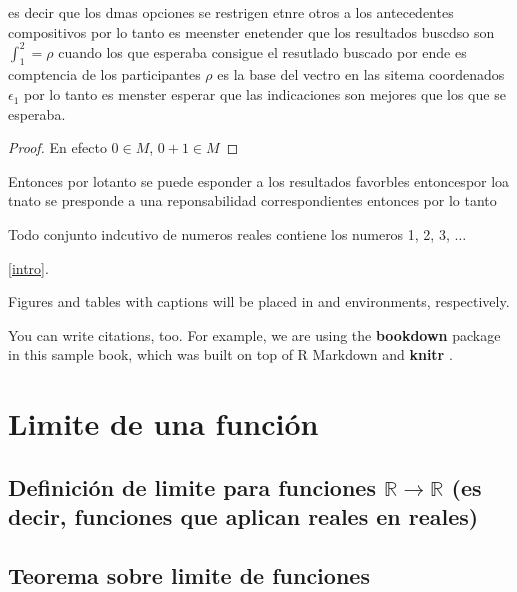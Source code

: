 \documentclass[12pt,]{report}
\theoremstyle{slplain}
\let\BeginKnitrBlock\begin \let\EndKnitrBlock\end
\begin{document}
es decir que los dmas opciones se restrigen etnre otros a los antecedentes compositivos por lo tanto es meenster enetender que los resultados buscdso son \(\int_1^2=\rho\) cuando los que esperaba consigue el resutlado buscado por ende es comptencia de los participantes \(\rho\) es la base del vectro en las sitema coordenados \(\epsilon_1\) por lo tanto es menster esperar que las indicaciones son mejores que los que se esperaba.
\BeginKnitrBlock{proof}
{}En efecto \(0\in M\), \(0+1\in M\)
\EndKnitrBlock{proof}

Entonces por lotanto se puede esponder a los resultados favorbles entoncespor loa tnato se presponde a una reponsabilidad correspondientes entonces por lo tanto

\BeginKnitrBlock{theorem}[Principio de inducción matemática]
\protect\hypertarget{thm:w1}{}{\label{thm:w1} {} }Todo conjunto indcutivo de numeros reales contiene los numeros 1, 2, 3, \(\ldots\)
\EndKnitrBlock{theorem}

\ref{intro}.

Figures and tables with captions will be placed in and environments, respectively.

You can write citations, too. For example, we are using the \textbf{bookdown} package \citep{R-bookdown} in this sample book, which was built on top of R Markdown and \textbf{knitr} \citep{xie2015}.

\hypertarget{limite-de-una-funciuxf3n}{%
\chapter{Limite de una función}\label{limite-de-una-funciuxf3n}}

\hypertarget{definiciuxf3n-de-limite-para-funciones-mathbbrto-mathbbr-es-decir-funciones-que-aplican-reales-en-reales}{%
\section{\texorpdfstring{Definición de limite para funciones \(\mathbb{R}\to \mathbb{R}\) (es decir, funciones que aplican reales en reales)}{Definición de limite para funciones \textbackslash{}mathbb\{R\}\textbackslash{}to \textbackslash{}mathbb\{R\} (es decir, funciones que aplican reales en reales)}}\label{definiciuxf3n-de-limite-para-funciones-mathbbrto-mathbbr-es-decir-funciones-que-aplican-reales-en-reales}}

\hypertarget{teorema-sobre-limite-de-funciones}{%
\section{Teorema sobre limite de funciones}\label{teorema-sobre-limite-de-funciones}}
\end{document}
